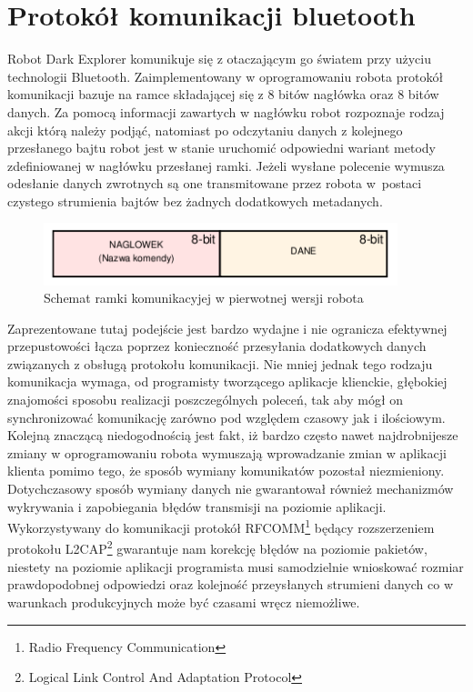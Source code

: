 \section{Protokół komunikacji bluetooth}
Robot Dark Explorer komunikuje się z otaczającym go światem przy użyciu
technologii Bluetooth. Zaimplementowany w oprogramowaniu robota protokół
komunikacji bazuje na ramce składającej się z 8 bitów nagłówka oraz 8 bitów
danych. Za pomocą informacji zawartych w nagłówku robot rozpoznaje
rodzaj akcji którą należy podjąć, natomiast po odczytaniu danych z kolejnego
przesłanego bajtu robot jest w stanie uruchomić odpowiedni wariant metody
zdefiniowanej w nagłówku przesłanej ramki. Jeżeli wysłane polecenie wymusza
odesłanie danych zwrotnych są one transmitowane przez robota w~postaci czystego
strumienia bajtów bez żadnych dodatkowych metadanych. 

\begin{figure}[h!]
 \centering
 \includegraphics[height=18mm]{../images/ch05/old_req_schema.png}
 \caption{Schemat ramki komunikacyjej w pierwotnej wersji robota}
 \label{fig:OldCommFrame}
\end{figure}

Zaprezentowane tutaj podejście jest bardzo wydajne i nie ogranicza efektywnej
przepustowości łącza poprzez konieczność przesyłania dodatkowych danych
związanych z obsługą protokołu komunikacji. Nie mniej jednak tego rodzaju
komunikacja wymaga, od programisty tworzącego aplikacje klienckie, głębokiej
znajomości sposobu realizacji poszczególnych poleceń, tak aby mógł on
synchronizować komunikację zarówno pod względem czasowy jak i ilościowym. Kolejną
znaczącą niedogodnością jest fakt, iż bardzo często nawet najdrobnijesze zmiany w
oprogramowaniu robota wymuszają wprowadzanie zmian w aplikacji klienta pomimo
tego, że sposób wymiany komunikatów pozostał niezmieniony. Dotychczasowy sposób
wymiany danych nie gwarantował również mechanizmów wykrywania i zapobiegania
błędów transmisji na poziomie aplikacji. Wykorzystywany do komunikacji protokół
RFCOMM\footnote{Radio Frequency Communication} będący rozszerzeniem protokołu
L2CAP\footnote{Logical Link Control And Adaptation Protocol} gwarantuje nam
korekcję błędów na poziomie pakietów, niestety na poziomie aplikacji programista
musi samodzielnie wnioskować rozmiar prawdopodobnej odpowiedzi oraz kolejność
przeysłanych strumieni danych co w warunkach produkcyjnych może być czasami wręcz
niemożliwe.


